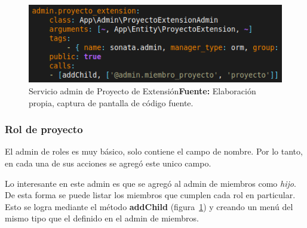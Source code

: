 \begin{figure}[h]
    \includegraphics[width=1\linewidth]{image/addChild.png}
    \caption{Servicio admin de Proyecto de Extensión\newline \textbf{Fuente:} Elaboración propia, captura de pantalla de código fuente.}
    \label{fig:image/addChild}
\end{figure}

\newpage
\subsubsection{Rol de proyecto}%
\label{ssub:rol_de_proyecto_admin}

El admin de roles es muy básico, solo contiene el campo de nombre. Por lo tanto, en cada una de sus acciones se agregó este unico campo.


Lo interesante en este admin es que se agregó al admin de miembros como \textit{hijo}. De esta forma se puede listar los miembros que cumplen cada rol en
particular.
Esto se logra mediante el método \textbf{addChild} (figura~\ref{fig:image/addChild}) y creando un menú del mismo tipo que el definido en el admin de miembros.

